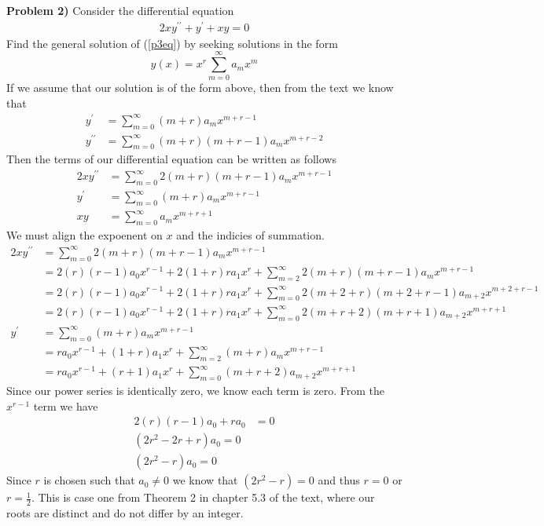 \documentclass[12pt]{article}
\newcommand{\problem}[1]{\hspace{-4 ex} \large \textbf{Problem #1} }
\begin{document}
\problem{2)} Consider the differential equation
	\begin{align} \label{p3eq}
		2xy^{\prime\prime} + y^\prime + xy = 0
	\end{align}
	Find the general solution of (\ref{p3eq}) by seeking solutions in the form
	$$
	y(x) = x^r \sum_{m=0}^\infty a_m x^m
	$$
	If we assume that our solution is of the form above, then from the text we know that
	\begin{align*}
		y^\prime & = \sum_{m=0}^\infty(m+r)a_mx^{m+r-1} \\
		y^{\prime\prime} & = \sum_{m=0}^\infty(m+r)(m+r-1)a_mx^{m+r-2}
	\end{align*}
	Then the terms of our differential equation can be written as follows
	\begin{align*}
		2xy^{\prime\prime} & = \sum_{m=0}^\infty 2(m+r)(m+r-1)a_mx^{m+r-1} \\
		y^\prime & = \sum_{m=0}^\infty(m+r)a_mx^{m+r-1} \\
		xy & = \sum_{m=0}^\infty a_m x^{m+r+1}
	\end{align*}
	We must align the expoenent on $x$ and the indicies of summation.
	\begin{align*}
		2xy^{\prime\prime} & = \sum_{m=0}^\infty 2(m+r)(m+r-1)a_mx^{m+r-1} \\
		& = 2(r)(r-1)a_0x^{r-1} + 2(1+r)ra_1x^{r} + \sum_{m=2}^\infty 2(m+r)(m+r-1)a_mx^{m+r-1} \\
		& = 2(r)(r-1)a_0x^{r-1} + 2(1+r)ra_1x^{r} + \sum_{m=0}^\infty 2(m+2+r)(m+2+r-1)a_{m+2}x^{m+2+r-1} \\
		& = 2(r)(r-1)a_0x^{r-1} + 2(1+r)ra_1x^{r} + \sum_{m=0}^\infty 2(m+r+2)(m+r+1)a_{m+2}x^{m+r+1} \\
		y^\prime & = \sum_{m=0}^\infty(m+r)a_mx^{m+r-1} \\
		& = ra_0x^{r-1} + (1+r)a_1x^{r} + \sum_{m=2}^\infty(m+r)a_mx^{m+r-1} \\
		& = ra_0x^{r-1} + (r+1)a_1x^{r} + \sum_{m=0}^\infty(m+r+2)a_{m+2}x^{m+r+1} 
	\end{align*}
	Since our power series is identically zero, we know each term is zero. From the $x^{r-1}$ term we have
	\begin{align*}
		2(r)(r-1)a_0 + ra_0 & = 0 \\
		(2r^2 - 2r + r)a_0 = 0 \\
		(2r^2 - r) a_0 = 0
	\end{align*}
	Since $r$ is chosen such that $a_0 \neq 0$ we know that $(2r^2 - r)=0$ and thus $r=0$ or $r=\tfrac{1}{2}$. This is case one from Theorem 2 in chapter 5.3 of the text, where our roots are distinct and do not differ by an integer. 
	
\end{document}
